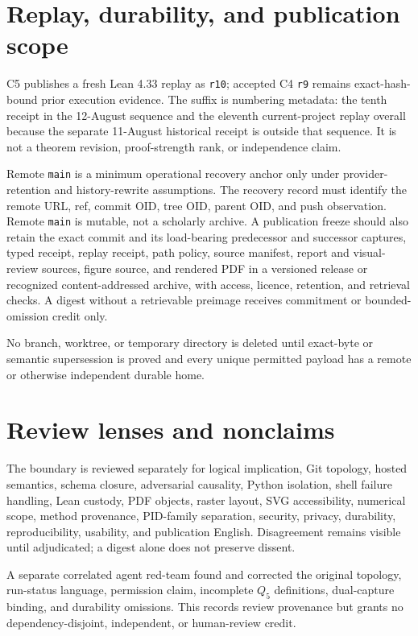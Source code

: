 \documentclass[11pt,a4paper]{article}
\begin{document}
\section{Replay, durability, and publication scope}

C5 publishes a fresh Lean 4.33 replay as \texttt{r10}; accepted C4 \texttt{r9} remains
exact-hash-bound prior execution evidence. The suffix is numbering metadata: the tenth receipt in the
12-August sequence and the eleventh current-project replay overall because the separate 11-August
historical receipt is outside that sequence. It is not a theorem revision, proof-strength rank, or
independence claim.

Remote \texttt{main} is a minimum operational recovery anchor only under provider-retention and
history-rewrite assumptions. The recovery record must identify the remote URL, ref, commit OID,
tree OID, parent OID, and push observation. Remote \texttt{main} is mutable, not a scholarly
archive. A publication freeze should also retain the exact commit and its load-bearing predecessor
and successor captures, typed receipt, replay receipt, path policy, source manifest, report and
visual-review sources, figure source, and rendered PDF in a versioned release or recognized
content-addressed archive, with access, licence, retention, and retrieval checks. A digest without
a retrievable preimage receives commitment or bounded-omission credit only.

No branch, worktree, or temporary directory is deleted until exact-byte or semantic supersession is
proved and every unique permitted payload has a remote or otherwise independent durable home.

\section{Review lenses and nonclaims}

The boundary is reviewed separately for logical implication, Git topology, hosted semantics,
schema closure, adversarial causality, Python isolation, shell failure handling, Lean custody, PDF
objects, raster layout, SVG accessibility, numerical scope, method provenance, PID-family
separation, security, privacy, durability, reproducibility, usability, and publication English.
Disagreement remains visible until adjudicated; a digest alone does not preserve dissent.

A separate correlated agent red-team found and corrected the original topology, run-status
language, permission claim, incomplete \(Q_5\) definitions, dual-capture binding, and durability
omissions. This records review provenance but grants no dependency-disjoint, independent, or
human-review credit.
\end{document}
